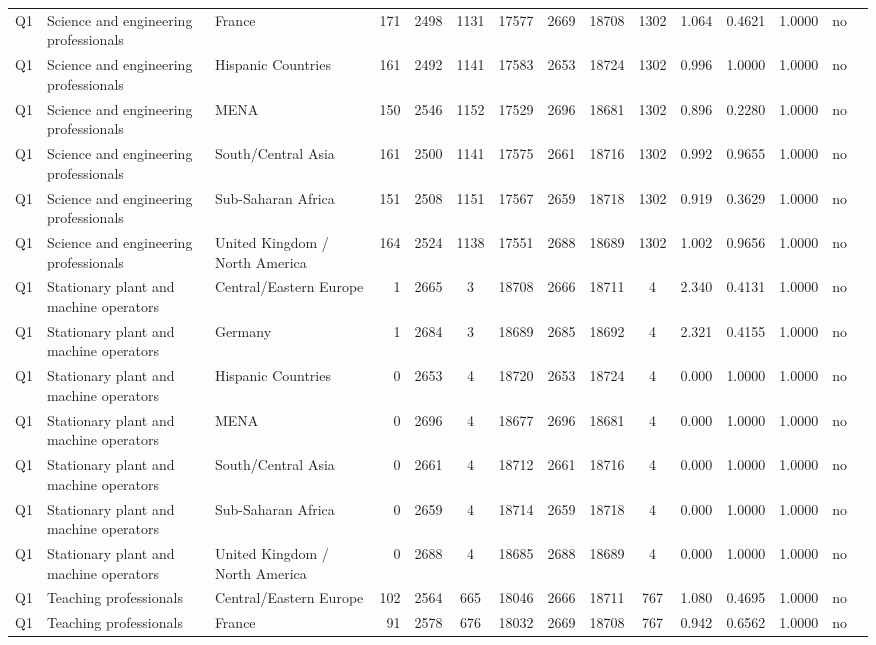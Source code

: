 \begin{longtable}{lllrcccccccccll}
Q1 & Science and engineering professionals & France & 171 & 2498 & 1131 & 17577 & 2669 & 18708 & 1302 & 1.064 & 0.4621 & 1.0000 & no \\
Q1 & Science and engineering professionals & Hispanic Countries & 161 & 2492 & 1141 & 17583 & 2653 & 18724 & 1302 & 0.996 & 1.0000 & 1.0000 & no \\
Q1 & Science and engineering professionals & MENA & 150 & 2546 & 1152 & 17529 & 2696 & 18681 & 1302 & 0.896 & 0.2280 & 1.0000 & no \\
Q1 & Science and engineering professionals & South/Central Asia & 161 & 2500 & 1141 & 17575 & 2661 & 18716 & 1302 & 0.992 & 0.9655 & 1.0000 & no \\
Q1 & Science and engineering professionals & Sub-Saharan Africa & 151 & 2508 & 1151 & 17567 & 2659 & 18718 & 1302 & 0.919 & 0.3629 & 1.0000 & no \\
Q1 & Science and engineering professionals & United Kingdom / North America & 164 & 2524 & 1138 & 17551 & 2688 & 18689 & 1302 & 1.002 & 0.9656 & 1.0000 & no \\
Q1 & Stationary plant and machine operators & Central/Eastern Europe & 1 & 2665 & 3 & 18708 & 2666 & 18711 & 4 & 2.340 & 0.4131 & 1.0000 & no \\
Q1 & Stationary plant and machine operators & Germany & 1 & 2684 & 3 & 18689 & 2685 & 18692 & 4 & 2.321 & 0.4155 & 1.0000 & no \\
Q1 & Stationary plant and machine operators & Hispanic Countries & 0 & 2653 & 4 & 18720 & 2653 & 18724 & 4 & 0.000 & 1.0000 & 1.0000 & no \\
Q1 & Stationary plant and machine operators & MENA & 0 & 2696 & 4 & 18677 & 2696 & 18681 & 4 & 0.000 & 1.0000 & 1.0000 & no \\
Q1 & Stationary plant and machine operators & South/Central Asia & 0 & 2661 & 4 & 18712 & 2661 & 18716 & 4 & 0.000 & 1.0000 & 1.0000 & no \\
Q1 & Stationary plant and machine operators & Sub-Saharan Africa & 0 & 2659 & 4 & 18714 & 2659 & 18718 & 4 & 0.000 & 1.0000 & 1.0000 & no \\
Q1 & Stationary plant and machine operators & United Kingdom / North America & 0 & 2688 & 4 & 18685 & 2688 & 18689 & 4 & 0.000 & 1.0000 & 1.0000 & no \\
Q1 & Teaching professionals & Central/Eastern Europe & 102 & 2564 & 665 & 18046 & 2666 & 18711 & 767 & 1.080 & 0.4695 & 1.0000 & no \\
Q1 & Teaching professionals & France & 91 & 2578 & 676 & 18032 & 2669 & 18708 & 767 & 0.942 & 0.6562 & 1.0000 & no \\

\end{longtable}
